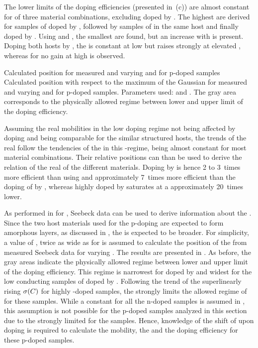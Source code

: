 The lower limits of the doping efficiencies (presented in \,(c)) are almost constant for  of three material combinations, excluding \lili doped by \CSF.
The highest \DopEffLL are derived for samples of \meo doped by \FS, followed by samples of \CSF in the same host and finally \lili doped by \FS. Using \lili and \CSF, the smallest \DopEffLL are found, but an increase with \C is present.
%
Doping both hosts by \FS, the \DopEffLL is constant at low \C but raises strongly at elevated \C, whereas for \CSF no gain at high \C is observed.

{Calculated \EtLong position for measured \Es and varying \CLong and \DopEffLong for p-doped samples}%
{Calculated \EtLong position \Et with respect to the maximum of the Gaussian \dosLong for measured \Es and varying \CLong and \DopEff for p-doped samples. Parameters used: \gausswidth[200] and \Tm[40]. The gray area corresponds to the physically allowed regime between lower and upper limit of the doping efficiency.
}

Assuming the real mobilities in the low doping regime not being affected by doping and being comparable for the similar structured hosts, the trends of the real \DopEff follow the tendencies of the \DopEffLL in this \C-regime, being almost constant for most material combinations. Their relative positions can than be used to derive the relation of the real \DopEff of the different materials.
Doping \meo by \FS is hence 2 to 3~times more efficient than using \CSF and approximately 7~times more efficient than the doping of \lili by \FS, whereas \lili highly doped by \CSF saturates at a \DopEff approximately 20~times lower.

As performed in  for \CS, Seebeck data can be used to derive information about the \EtLongL. Since the two host materials used for the p-doping are expected to form amorphous layers, as discussed in , the \dosLong is expected to be broader. For simplicity, a value of \gausswidth[200], twice as wide as for \CS is assumed to calculate the position of the \Et from measured Seebeck data for varying \DopEff. The results are presented in . As before, the gray areas indicate the physically allowed regime between lower and upper limit of the doping efficiency.
This regime is narrowest for \meo doped by \FS and widest for the low conducting samples of \lili doped by \CSF. Following the trend of the superlinearly rising $\c(\C)$ for highly \FS-doped samples, the \DopEffLL strongly limits the allowed regime of \Et for these samples.
While a constant \Et for all the n-doped samples is assumed in , this assumption is not possible for the p-doped samples analyzed in this section due to the strongly limited \Et for the \FS samples. Hence, knowledge of the shift of \Et upon doping is required to calculate the mobility, the \nhLong and the doping efficiency for these p-doped samples.

